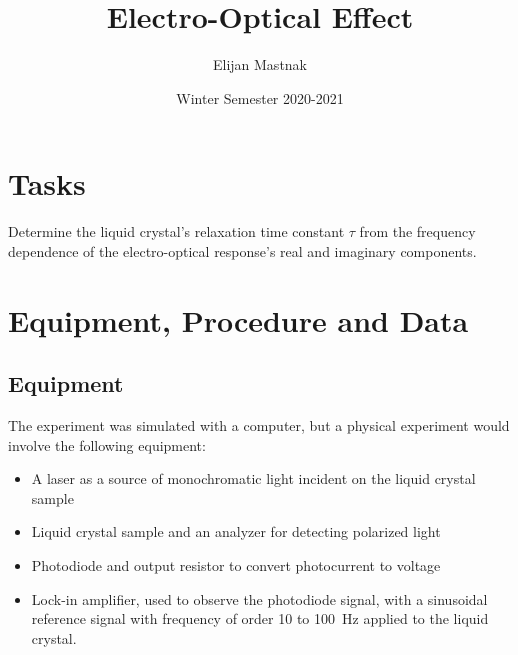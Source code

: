 \documentclass[11pt, a4paper]{article}
\begin{document}
\title{Electro-Optical Effect}
\author{Elijan Mastnak}
\date{Winter Semester 2020-2021}
\maketitle
		
		
\section{Tasks}
 Determine the liquid crystal's relaxation time constant $ \tau $ from the frequency dependence of the electro-optical response's real and imaginary components.


\section{Equipment, Procedure and Data}


\subsection{Equipment}
The experiment was simulated with a computer, but a physical experiment would involve the following equipment:
\begin{itemize}
	\item A laser as a source of monochromatic light incident on the liquid crystal sample
	
	\item Liquid crystal sample and an analyzer for detecting polarized light
	
	\item Photodiode and output resistor to convert photocurrent to voltage
	
	\item Lock-in amplifier, used to observe the photodiode signal, with a sinusoidal reference signal with frequency of order 10 to \SI{100}{\hertz} applied to the liquid crystal. 
	
\end{itemize}
\end{document}
